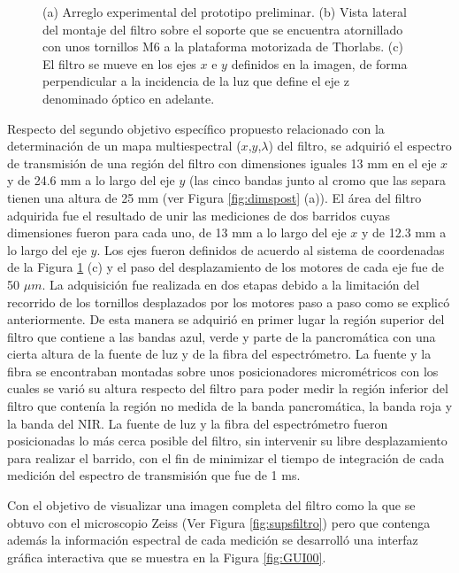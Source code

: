 \begin{figure}[H]
\hfill%
\hfill%
\caption{(a) Arreglo experimental del prototipo preliminar. (b) Vista lateral del montaje del filtro sobre el soporte que se encuentra atornillado con unos tornillos M6 a la plataforma motorizada de Thorlabs. (c) El filtro se mueve en los ejes $\textit{x}$ e $\textit{y}$ definidos en la imagen, de forma perpendicular a la incidencia de la luz que define el eje z denominado óptico en adelante.}
\label{fig:p}
\end{figure}

Respecto del segundo objetivo específico propuesto relacionado con la determinación de un mapa multiespectral ($\textit{x}$,$\textit{y}$,$\lambda$) del filtro, se adquirió el espectro de transmisión de una región del filtro con dimensiones iguales 13 mm en el eje $\textit{x}$ y de 24.6 mm a lo largo del eje $\textit{y}$ (las cinco bandas junto al cromo que las separa tienen una altura de 25 mm (ver Figura \ref{fig:dimspost} (a)). El área del filtro adquirida fue el resultado de unir las mediciones de dos barridos cuyas dimensiones fueron para cada uno, de 13 mm a lo largo del eje $\textit{x}$ y de 12.3 mm a lo largo del eje $\textit{y}$. Los ejes fueron definidos de acuerdo al sistema de coordenadas de la Figura \ref{fig:p} (c) y el paso del desplazamiento de los motores de cada eje fue de 50 $\mu m$. La adquisición fue realizada en dos etapas debido a la limitación del recorrido de los tornillos desplazados por los motores paso a paso como se explicó anteriormente. De esta manera se adquirió en primer lugar la región superior del filtro que contiene a las bandas azul, verde y parte de la pancromática con una cierta altura de la fuente de luz y de la fibra del espectrómetro. La fuente y la fibra se encontraban montadas sobre unos posicionadores micrométricos con los cuales se varió su altura respecto del filtro para poder medir la región inferior del filtro que contenía la región no medida de la banda pancromática, la banda roja y la banda del NIR. La fuente de luz y la fibra del espectrómetro fueron posicionadas lo más cerca posible del filtro, sin intervenir su libre desplazamiento para realizar el barrido, con el fin de minimizar el tiempo de integración de cada medición del espectro de transmisión que fue de 1 ms.

Con el objetivo de visualizar una imagen completa del filtro como la que se obtuvo con el microscopio Zeiss (Ver Figura \ref{fig:supsfiltro}) pero que contenga además la información espectral de cada medición se desarrolló una interfaz gráfica interactiva que se muestra en la Figura \ref{fig:GUI00}.

